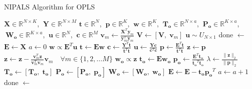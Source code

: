 \begin{algorithm}[H]
\caption{NIPALS Algorithm for OPLS}
\label{algorithm.3.3}
\begin{algorithmic}[1]
\REQUIRE $\mathbf{X} \in \mathbb{R}^{N \times K}$,%
       $\:\mathbf{Y} \in \mathbb{R}^{N \times M}$
\ENSURE $\mathbf{t} \in \mathbb{R}^N$,%
      $\:\mathbf{p} \in \mathbb{R}^K$,%
      $\:\mathbf{w} \in \mathbb{R}^K$,%
      $\:\mathbf{T_o} \in \mathbb{R}^{N \times a}$,%
      $\:\mathbf{P_o} \in \mathbb{R}^{K \times a}$,%
      $\:\mathbf{W_o} \in \mathbb{R}^{K \times a}$,%
      $\:\mathbf{u} \in \mathbb{R}^N$,%
      $\:\mathbf{c} \in \mathbb{R}^M$
  \STATE $\mathbf{v}_m \gets \tfrac{\mathbf{X}^T \mathbf{y}_m}
                                   {\mathbf{y}_m^T \mathbf{y}_m}$
  \STATE $\mathbf{V} \gets [\mathbf{V}, \; \mathbf{v}_m]$
\ENDFOR
\STATE $\mathbf{u} \sim U_{N \times 1}$ 
\STATE done $\gets$ \FALSE
\STATE $\mathbf{E} \gets \mathbf{X}$
\STATE $a \gets 0$
  \REPEAT
    \STATE $\mathbf{w} \propto \mathbf{E}^T \mathbf{u}$
    \STATE $\mathbf{t} \gets \mathbf{E} \mathbf{w}$
    \STATE $\mathbf{c} \gets \tfrac{\mathbf{Y}^T \mathbf{t}}
                                   {\mathbf{t}^T \mathbf{t}}$
    \STATE $\mathbf{u} \gets \tfrac{\mathbf{Y} \mathbf{c}}
                                   {\mathbf{c}^T \mathbf{c}}$
  \UNTIL{$\tau < \varepsilon$}
  \STATE $\mathbf{p} \gets \tfrac{\mathbf{E}^T \mathbf{t}}
                                 {\mathbf{t}^T \mathbf{t}}$
  \STATE $\mathbf{z} \gets \mathbf{p}$
  \STATE $\mathbf{z} \gets \mathbf{z} -
          \tfrac{\mathbf{v}_m^T \mathbf{z}}
                {\mathbf{v}_m^T \mathbf{v}_m} \mathbf{v}_m
          \quad \forall m \in \{1, 2, \dots M\}$
  \STATE $\mathbf{w_o} \propto \mathbf{z}$
  \STATE $\mathbf{t_o} \gets \mathbf{E} \mathbf{w_o}$
  \STATE $\mathbf{p_o} \gets \tfrac{\mathbf{E}^T \mathbf{t_o}}
                                   {\mathbf{t_o}^T \mathbf{t_o}}$
  \STATE $\lambda \gets \tfrac{\| \mathbf{z} \|_2}{\| \mathbf{p} \|_2}$
    \STATE $\mathbf{T_o} \gets [\mathbf{T_o}, \; \mathbf{t_o}]$
    \STATE $\mathbf{P_o} \gets [\mathbf{P_o}, \; \mathbf{p_o}]$
    \STATE $\mathbf{W_o} \gets [\mathbf{W_o}, \; \mathbf{w_o}]$
    \STATE $\mathbf{E} \gets \mathbf{E} - \mathbf{t_o} \mathbf{p_o}^T$
    \STATE $a \gets a + 1$
  \ELSE
    \STATE done $\gets$ \TRUE
  \ENDIF
\ENDWHILE
\end{algorithmic}
\end{algorithm}

